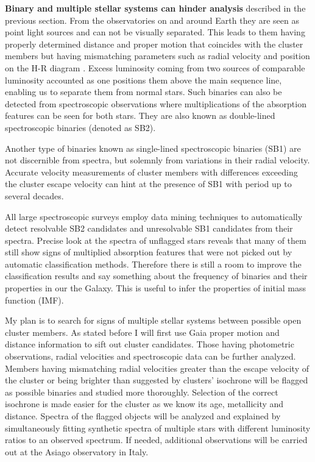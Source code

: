 \textbf{Binary and multiple stellar systems can hinder analysis} described in the previous section. From the observatories on and around Earth they are seen as point light sources and can not be visually separated. This leads to them having properly determined distance and proper motion that coincides with the cluster members but having mismatching parameters such as radial velocity and position on the H-R diagram \cite{2007A&A...473..829M}. Excess luminosity coming from two sources of comparable luminosity accounted as one positions them above the main sequence line, enabling us to separate them from normal stars. Such binaries can also be detected from spectroscopic observations where multiplications of the absorption features can be seen for both stars. They are also known as double-lined spectroscopic binaries (denoted as SB2).

Another type of binaries known as single-lined spectroscopic binaries (SB1) are not discernible from spectra, but solemnly from variations in their radial velocity. Accurate velocity measurements of cluster members with differences exceeding the cluster escape velocity can hint at the presence of SB1 with period up to several decades.

All large spectroscopic surveys employ data mining techniques to automatically detect resolvable SB2 candidates \cite{2010AJ....140..184M, 2017ApJS..228...24T} and unresolvable SB1 candidates \cite{2011AJ....141..200M} from their spectra. Precise look at the spectra of unflagged stars reveals that many of them still show signs of multiplied absorption features that were not picked out by automatic classification methods. Therefore there is still a room to improve the classification results and say something about the frequency of binaries and their properties in our the Galaxy. This is useful to infer the properties of initial mass function (IMF).

My plan is to search for signs of multiple stellar systems between possible open cluster members. As stated before I will first use Gaia proper motion and distance information to sift out cluster candidates. Those having photometric observations, radial velocities and spectroscopic data can be further analyzed. Members having mismatching radial velocities greater than the escape velocity of the cluster or being brighter than suggested by clusters' isochrone will be flagged as possible binaries and studied more thoroughly. Selection of the correct isochrone is made easier for the cluster as we know its age, metallicity and distance. Spectra  of the flagged objects will be analyzed and explained by simultaneously fitting \cite{2018MNRAS.473.5043E} synthetic spectra \cite{2005A&A...442.1127M} of multiple stars with different luminosity ratios to an observed spectrum. If needed, additional observations will be carried out at the Asiago observatory in Italy. %

